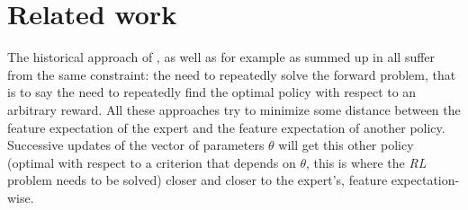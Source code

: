 \documentclass{article}
\begin{document}
\section{Related work}
\label{biblio.sec}
The historical approach of \cite{ng2000algorithms}, as well as for example \cite{abbeel2004apprenticeship,syed2008apprenticeship,syed2008game, ziebart2008maximum} as summed up in \cite{neu2009training} all suffer from the same constraint: the need to repeatedly solve the forward problem, that is to say the need to repeatedly find the optimal policy with respect to an arbitrary reward. All these approaches try to minimize some distance between the feature expectation of the expert and the feature expectation of another policy. Successive updates of the vector of parameters $\theta$ will get this other policy (optimal with respect to a criterion that depends on $\theta$, this is where the \emph{RL} problem needs to be solved) closer and closer to the expert's, feature expectation-wise.\\
\end{document}
